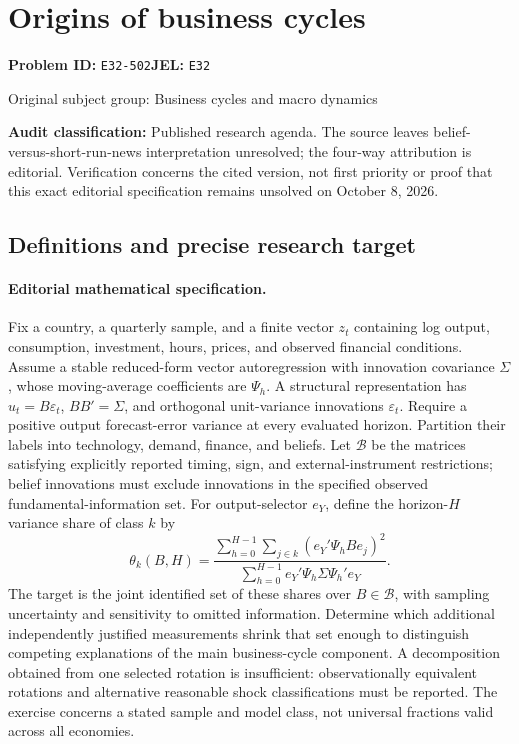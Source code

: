 \documentclass[11pt,a4paper]{article}
\begin{document}
\section*{Origins of business cycles}
\textbf{Problem ID:} \texttt{E32-502}\quad \textbf{JEL:} \texttt{E32}\par
\label{problem:OP-0231}
{\sffamily\small\color{muted}Original subject group: Business cycles and macro dynamics\par}
\label{definitions:problem:30007512}
\textbf{Audit classification:} Published research agenda. The source leaves belief-versus-short-run-news interpretation unresolved; the four-way attribution is editorial. Verification concerns the cited version, not first priority or proof that this exact editorial specification remains unsolved on October 8, 2026.
\subsection*{Definitions and precise research target}
\paragraph{Editorial mathematical specification.} Fix a country, a quarterly sample, and a finite vector \(z_t\) containing log output, consumption, investment, hours, prices, and observed financial conditions. Assume a stable reduced-form vector autoregression with innovation covariance \(\Sigma\), whose moving-average coefficients are \(\Psi_h\). A structural representation has \(u_t=B\varepsilon_t\), \(BB'=\Sigma\), and orthogonal unit-variance innovations \(\varepsilon_t\). Require a positive output forecast-error variance at every evaluated horizon. Partition their labels into technology, demand, finance, and beliefs. Let \(\mathcal B\) be the matrices satisfying explicitly reported timing, sign, and external-instrument restrictions; belief innovations must exclude innovations in the specified observed fundamental-information set.
For output-selector \(e_Y\), define the horizon-\(H\) variance share of class \(k\) by
\[
\theta_k(B,H)=\frac{\sum_{h=0}^{H-1}\sum_{j\in k}(e_Y'\Psi_hB e_j)^2}
{\sum_{h=0}^{H-1}e_Y'\Psi_h\Sigma\Psi_h'e_Y}.
\]
The target is the joint identified set of these shares over \(B\in\mathcal B\), with sampling uncertainty and sensitivity to omitted information. Determine which additional independently justified measurements shrink that set enough to distinguish competing explanations of the main business-cycle component. A decomposition obtained from one selected rotation is insufficient: observationally equivalent rotations and alternative reasonable shock classifications must be reported. The exercise concerns a stated sample and model class, not universal fractions valid across all economies.
\end{document}
